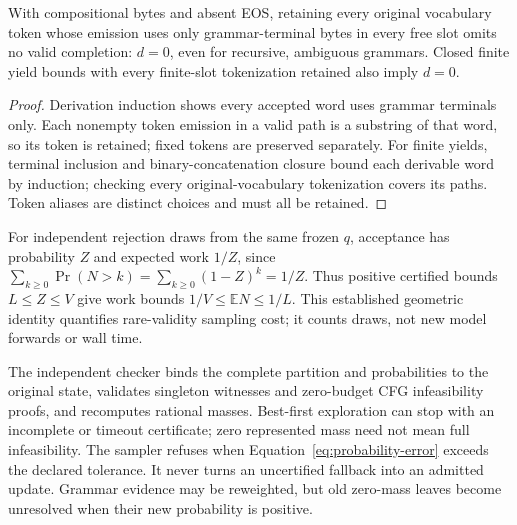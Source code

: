 \begin{theorem}
With compositional bytes and absent EOS, retaining every original vocabulary
token whose emission uses only grammar-terminal bytes in every free slot
omits no valid completion: $d=0$, even for recursive, ambiguous grammars.
Closed finite yield bounds with every finite-slot tokenization retained also
imply $d=0$.
\label{thm:probability-coverage}
\end{theorem}
\begin{proof}
Derivation induction shows every accepted word uses grammar terminals only.
Each nonempty token emission in a valid path is a substring of that word, so
its token is retained; fixed tokens are preserved separately. For finite yields,
terminal inclusion and binary-concatenation closure bound each derivable word
by induction; checking every original-vocabulary tokenization covers its paths.
Token aliases are distinct choices and must all be retained.
\end{proof}

For independent rejection draws from the same frozen $q$, acceptance has
probability $Z$ and expected work $1/Z$, since
$\sum_{k\geq0}\Pr(N>k)=\sum_{k\geq0}(1-Z)^k=1/Z$.
Thus positive certified bounds $L\leq Z\leq V$ give work bounds
$1/V\leq\mathbb{E}N\leq1/L$. This established geometric identity quantifies
rare-validity sampling cost; it counts draws, not new model forwards or wall time.

The independent checker binds the complete partition and probabilities to the
original state, validates singleton witnesses and zero-budget CFG infeasibility
proofs, and recomputes rational masses. Best-first exploration can stop with an
incomplete or timeout certificate; zero represented mass need not mean full
infeasibility. The sampler refuses when Equation~\ref{eq:probability-error}
exceeds the declared tolerance. It never turns an uncertified fallback into
an admitted update. Grammar evidence may be reweighted, but old zero-mass leaves
become unresolved when their new probability is positive.

